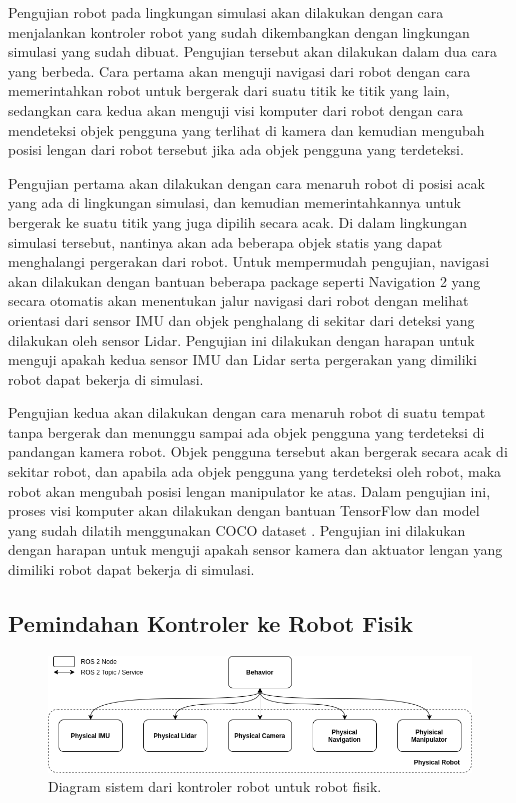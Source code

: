 Pengujian robot pada lingkungan simulasi akan dilakukan dengan cara menjalankan kontroler robot yang sudah dikembangkan dengan lingkungan simulasi yang sudah dibuat.
Pengujian tersebut akan dilakukan dalam dua cara yang berbeda.
Cara pertama akan menguji navigasi dari robot dengan cara memerintahkan robot untuk bergerak dari suatu titik ke titik yang lain, sedangkan cara kedua akan menguji visi komputer dari robot dengan cara mendeteksi objek pengguna yang terlihat di kamera dan kemudian mengubah posisi lengan dari robot tersebut jika ada objek pengguna yang terdeteksi.

Pengujian pertama akan dilakukan dengan cara menaruh robot di posisi acak yang ada di lingkungan simulasi, dan kemudian memerintahkannya untuk bergerak ke suatu titik yang juga dipilih secara acak.
Di dalam lingkungan simulasi tersebut, nantinya akan ada beberapa objek statis yang dapat menghalangi pergerakan dari robot.
Untuk mempermudah pengujian, navigasi akan dilakukan dengan bantuan beberapa package seperti Navigation 2 \citep{Navigation2} yang secara otomatis akan menentukan jalur navigasi dari robot dengan melihat orientasi dari sensor IMU dan objek penghalang di sekitar dari deteksi yang dilakukan oleh sensor Lidar.
Pengujian ini dilakukan dengan harapan untuk menguji apakah kedua sensor IMU dan Lidar serta pergerakan yang dimiliki robot dapat bekerja di simulasi.

Pengujian kedua akan dilakukan dengan cara menaruh robot di suatu tempat tanpa bergerak dan menunggu sampai ada objek pengguna yang terdeteksi di pandangan kamera robot.
Objek pengguna tersebut akan bergerak secara acak di sekitar robot, dan apabila ada objek pengguna yang terdeteksi oleh robot, maka robot akan mengubah posisi lengan manipulator ke atas.
Dalam pengujian ini, proses visi komputer akan dilakukan dengan bantuan TensorFlow \citep{TensorFlow} dan model yang sudah dilatih menggunakan COCO dataset \citep{CocoDataset}.
Pengujian ini dilakukan dengan harapan untuk menguji apakah sensor kamera dan aktuator lengan yang dimiliki robot dapat bekerja di simulasi.

\subsection{Pemindahan Kontroler ke Robot Fisik}

\begin{figure} [ht] \centering
	\includegraphics[scale=0.45]{gambar/controller-transfer.png}
	\caption{Diagram sistem dari kontroler robot untuk robot fisik.}
	\label{fig:ControllerTransfer}
\end{figure}

